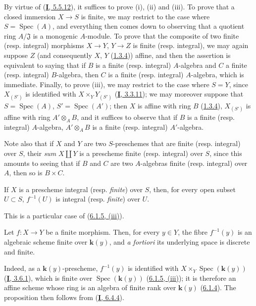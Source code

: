 
By virtue of (\hyperref[I.5.5.12]{\textbf{I}, 5.5.12}), it suffices to prove (i),
(ii) and (iii). To prove that a closed immersion $X\to S$ is finite, we may
restrict to the case where $S=\operatorname{Spec}(A)$, and everything then
comes down to observing that a quotient ring $A/\mathfrak{J}$ is a monogenic
$A$-module. To prove that the composite of two finite (resp. integral)
morphisms $X\to Y$, $Y\to Z$ is finite (resp. integral), we may again suppose
$Z$ (and consequently $X$, $Y$ (\hyperref[II.1.3.4]{1.3.4})) affine, and
then the assertion is equivalent to saying that if $B$ is a finite (resp.
integral) $A$-algebra and $C$ a finite (resp. integral) $B$-algebra, then
$C$ is a finite (resp. integral) $A$-algebra, which is immediate. Finally, to
prove (iii), we may restrict to the case where $S=Y$, since $X_{(S')}$ is
identified with $X\times_Y Y_{(S')}$ (\hyperref[I.3.3.11]{\textbf{I}, 3.3.11}); we
may moreover suppose that $S=\operatorname{Spec}(A)$,
$S'=\operatorname{Spec}(A')$; then $X$ is affine with ring $B$
(\hyperref[II.1.3.4]{1.3.4}), $X_{(S')}$ is affine with ring
$A'\otimes_A B$, and it suffices to observe that if $B$ is a finite (resp.
integral) $A$-algebra, $A'\otimes_A B$ is a finite (resp. integral)
$A'$-algebra.

Note also that if $X$ and $Y$ are two $S$-preschemes that are finite (resp.
integral) over $S$, their \emph{sum} $X\amalg Y$ is a prescheme finite
(resp. integral) over $S$, since this amounts to seeing that if $B$ and $C$
are two $A$-algebras finite (resp. integral) over $A$, then so is
$B\times C$.

\begin{corollary}[6.1.6]
\label{II.6.1.6}
If $X$ is a prescheme integral \textup{(resp. \emph{finite})} over $S$, then, for every open
subset $U\subset S$, $f^{-1}(U)$ is integral \textup{(resp. \emph{finite})} over $U$.
\end{corollary}

This is a particular case of (\hyperref[II.6.1.5]{6.1.5, (iii)}).

\begin{corollary}[6.1.7]
\label{II.6.1.7}
Let $f:X\to Y$ be a finite morphism. Then, for every $y\in Y$, the fibre
$f^{-1}(y)$ is an algebraic scheme finite over $\boldsymbol{k}(y)$, and \emph{a fortiori}
its underlying space is discrete and finite.
\end{corollary}

Indeed, as a $\boldsymbol{k}(y)$-prescheme, $f^{-1}(y)$ is identified with
$X\times_Y\operatorname{Spec}(\boldsymbol{k}(y))$ (\hyperref[I.3.6.1]{\textbf{I}, 3.6.1}), which
is finite over $\operatorname{Spec}(\boldsymbol{k}(y))$
(\hyperref[II.6.1.5]{6.1.5, (iii)}); it is therefore an affine scheme
whose ring is an algebra of finite rank over $\boldsymbol{k}(y)$
(\hyperref[II.6.1.4]{6.1.4}). The proposition then follows from
(\hyperref[I.6.4.4]{\textbf{I}, 6.4.4}).

